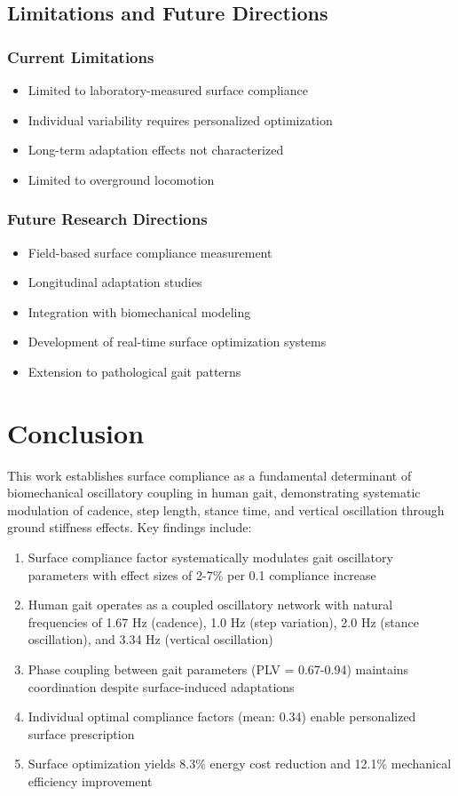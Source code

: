 \documentclass[12pt]{article}
\begin{document}
\subsection{Limitations and Future Directions}

\subsubsection{Current Limitations}
\begin{itemize}
\item Limited to laboratory-measured surface compliance
\item Individual variability requires personalized optimization
\item Long-term adaptation effects not characterized
\item Limited to overground locomotion
\end{itemize}

\subsubsection{Future Research Directions}
\begin{itemize}
\item Field-based surface compliance measurement
\item Longitudinal adaptation studies
\item Integration with biomechanical modeling
\item Development of real-time surface optimization systems
\item Extension to pathological gait patterns
\end{itemize}

\section{Conclusion}

This work establishes surface compliance as a fundamental determinant of biomechanical oscillatory coupling in human gait, demonstrating systematic modulation of cadence, step length, stance time, and vertical oscillation through ground stiffness effects. Key findings include:

\begin{enumerate}
\item Surface compliance factor systematically modulates gait oscillatory parameters with effect sizes of 2-7\% per 0.1 compliance increase
\item Human gait operates as a coupled oscillatory network with natural frequencies of 1.67 Hz (cadence), 1.0 Hz (step variation), 2.0 Hz (stance oscillation), and 3.34 Hz (vertical oscillation)
\item Phase coupling between gait parameters (PLV = 0.67-0.94) maintains coordination despite surface-induced adaptations
\item Individual optimal compliance factors (mean: 0.34) enable personalized surface prescription
\item Surface optimization yields 8.3\% energy cost reduction and 12.1\% mechanical efficiency improvement
\end{enumerate}
\end{document}
